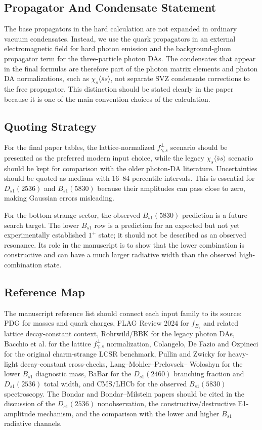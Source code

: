 \documentclass[11pt]{article}
\newcommand{\Dsone}{D_{s1}}
\newcommand{\Bs}{B_s}
\newcommand{\Bsone}{B_{s1}}
\begin{document}
\subsection{Propagator And Condensate Statement}

The base propagators in the hard calculation are not expanded in ordinary
vacuum condensates.  Instead, we use the quark propagators in an external
electromagnetic field for hard photon emission and the background-gluon
propagator term for the three-particle photon DAs.  The condensates that appear
in the final formulas are therefore part of the photon matrix elements and
photon DA normalizations, such as
$\chi_s\langle\bar s s\rangle$, not separate SVZ condensate corrections to the
free propagator.  This distinction should be stated clearly in the paper
because it is one of the main convention choices of the calculation.

\subsection{Quoting Strategy}

For the final paper tables, the lattice-normalized
$f_{\gamma,s}^{\perp}$ scenario should be presented as the preferred modern
input choice, while the legacy $\chi_s\langle\bar s s\rangle$ scenario should
be kept for comparison with the older photon-DA literature.  Uncertainties
should be quoted as medians with 16--84 percentile intervals.  This is
essential for $\Dsone(2536)$ and $\Bsone(5830)$ because their amplitudes can
pass close to zero, making Gaussian errors misleading.

For the bottom-strange sector, the observed $\Bsone(5830)$ prediction is a
future-search target.  The lower $\Bsone$ row is a prediction for an expected
but not yet experimentally established $1^+$ state; it should not be described
as an observed resonance.  Its role in the manuscript is to show that the lower
combination is constructive and can have a much larger radiative width than the
observed high-combination state.

\subsection{Reference Map}

The manuscript reference list should connect each input family to its source:
PDG for masses and quark charges, FLAG Review 2024 for $f_{\Bs}$ and related
lattice decay-constant context, Rohrwild/BBK for the legacy photon DAs,
Bacchio et al. for the lattice $f_{\gamma,s}^{\perp}$ normalization, Colangelo,
De Fazio and Ozpineci for the original charm-strange LCSR benchmark, Pullin and
Zwicky for heavy-light decay-constant cross-checks, Lang--Mohler--Prelovsek--
Woloshyn for the lower $\Bsone$ diagnostic mass, BaBar for the
$\Dsone(2460)$ branching fraction and $\Dsone(2536)$ total width, and CMS/LHCb
for the observed $\Bsone(5830)$ spectroscopy.  The Bondar and Bondar--Milstein
papers should be cited in the discussion of the $\Dsone(2536)$ nonobservation,
the constructive/destructive E1-amplitude mechanism, and the comparison with
the lower and higher $B_{s1}$ radiative channels.
\end{document}
